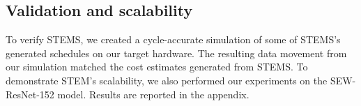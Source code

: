\subsection{Validation and scalability}

To verify STEMS, we created a cycle-accurate simulation of some of STEMS's generated schedules on our target hardware. The resulting data movement from our simulation matched the cost estimates generated from STEMS. To demonstrate STEM's scalability, we also performed our experiments on the SEW-ResNet-152 model. Results are reported in the appendix.










